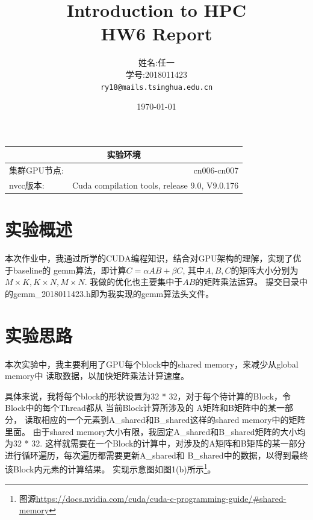 \documentclass[UTF8]{article}
\title{Introduction to HPC \\ HW6 Report} %
\author{姓名:任一  \\学号:2018011423\\ \texttt{ry18@mails.tsinghua.edu.cn}} %
\date{\today} %
\begin{document}
\maketitle %
\begin{center}
    \begin{tabular}{l  r}
    \hline
        \multicolumn{2}{c}{实验环境} \\ \hline
        集群GPU节点: & cn006-cn007\\ \hline
        nvcc版本: & Cuda compilation tools, release 9.0, V9.0.176 \\ \hline%

    \end{tabular}
\end{center}
\newpage




\section{实验概述}
本次作业中，我通过所学的CUDA编程知识，结合对GPU架构的理解，实现了优于baseline的
gemm算法，即计算$C=\alpha AB+\beta C$, 其中$A, B, C$的矩阵大小分别为$M\times K, K\times N, M\times N$.
我做的优化也主要集中于$AB$的矩阵乘法运算。
提交目录中的gemm\_2018011423.h即为我实现的gemm算法头文件。

\section{实验思路}
本次实验中，我主要利用了GPU每个block中的shared memory，来减少从global memory中
读取数据，以加快矩阵乘法计算速度。

具体来说，我将每个block的形状设置为32 * 32，对于每个待计算的Block，令Block中的每个Thread都从
当前Block计算所涉及的
A矩阵和B矩阵中的某一部分，
读取相应的一个元素到A\_shared和B\_shared这样的shared memory中的矩阵里面。
由于shared memory大小有限，我固定A\_shared和B\_shared矩阵的大小均为32 * 32.
这样就需要在一个Block的计算中，对涉及的A矩阵和B矩阵的某一部分进行循环遍历，每次遍历都需要更新A\_shared和
B\_shared中的数据，以得到最终该Block内元素的计算结果。
实现示意图如图1(b)所示\footnote{图源\url{https://docs.nvidia.com/cuda/cuda-c-programming-guide/#shared-memory}}。
\end{document}
